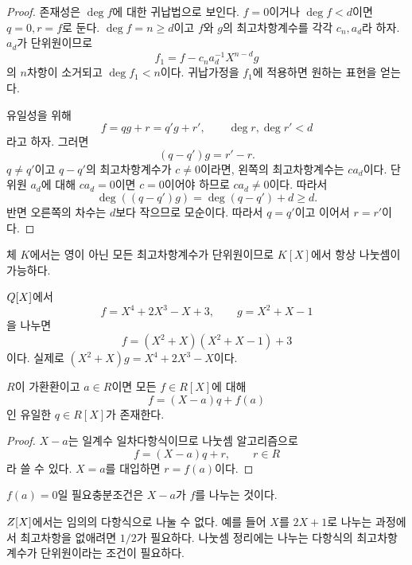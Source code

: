 \begin{proof}
존재성은 $\deg f$에 대한 귀납법으로 보인다. $f=0$이거나 $\deg f<d$이면 $q=0,r=f$로 둔다. $\deg f=n\ge d$이고 $f$와 $g$의 최고차항계수를 각각 $c_n,a_d$라 하자. $a_d$가 단위원이므로
\[
 f_1=f-c_na_d^{-1}X^{n-d}g
\]
의 $n$차항이 소거되고 $\deg f_1<n$이다. 귀납가정을 $f_1$에 적용하면 원하는 표현을 얻는다.

유일성을 위해
\[
  f=qg+r=q'g+r',
  \qquad
  \deg r,\deg r'<d
\]
라고 하자. 그러면
\[
 (q-q')g=r'-r.
\]
$q\ne q'$이고 $q-q'$의 최고차항계수가 $c\ne0$이라면, 왼쪽의 최고차항계수는 $ca_d$이다. 단위원 $a_d$에 대해 $ca_d=0$이면 $c=0$이어야 하므로 $ca_d\ne0$이다. 따라서
\[
  \deg((q-q')g)=\deg(q-q')+d\ge d.
\]
반면 오른쪽의 차수는 $d$보다 작으므로 모순이다. 따라서 $q=q'$이고 이어서 $r=r'$이다.
\end{proof}

체 $K$에서는 영이 아닌 모든 최고차항계수가 단위원이므로 $K[X]$에서 항상 나눗셈이 가능하다.

\begin{example}
$Q[X]$에서
\[
 f=X^4+2X^3-X+3,\qquad g=X^2+X-1
\]
을 나누면
\[
 f=(X^2+X)(X^2+X-1)+3
\]
이다. 실제로 $(X^2+X)g=X^4+2X^3-X$이다.
\end{example}

\begin{corollary}[나머지정리]
$R$이 가환환이고 $a\in R$이면 모든 $f\in R[X]$에 대해
\[
  f=(X-a)q+f(a)
\]
인 유일한 $q\in R[X]$가 존재한다.
\end{corollary}

\begin{proof}
$X-a$는 일계수 일차다항식이므로 나눗셈 알고리즘으로
\[
  f=(X-a)q+r,
  \qquad r\in R
\]
라 쓸 수 있다. $X=a$를 대입하면 $r=f(a)$이다.
\end{proof}

\begin{corollary}[인수정리]
$f(a)=0$일 필요충분조건은 $X-a$가 $f$를 나누는 것이다.
\end{corollary}

\begin{pitfall}
$Z[X]$에서는 임의의 다항식으로 나눌 수 없다. 예를 들어 $X$를 $2X+1$로 나누는 과정에서 최고차항을 없애려면 $1/2$가 필요하다. 나눗셈 정리에는 나누는 다항식의 최고차항계수가 단위원이라는 조건이 필요하다.
\end{pitfall}

